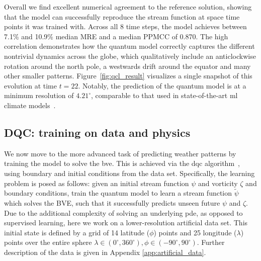 \documentclass[aps,pra,a4paper,twocolumn,longbibliography,groupedaddress]{revtex4-2}
\begin{document}
Overall we find excellent numerical agreement to the reference solution, showing that the model can successfully reproduce the stream function at space time points it was trained with. Across all 8 time steps, the model achieves between 7.1\% and 10.9\% median MRE and a median PPMCC of 0.870. The high correlation demonstrates how the quantum model correctly captures the different nontrivial dynamics across the globe, which qualitatively include an anticlockwise rotation around the north pole, a westwards drift around the equator and many other smaller patterns. Figure~\ref{fig:qcl_result} visualizes a single snapshot of this evolution at time $t=22$. Notably, the prediction of the quantum model is at a minimum resolution of $4.21^\circ$, comparable to that used in state-of-the-art \gls{ml} climate models~\cite{nguyen2023climax}.


\subsection{DQC: training on data and physics}
\label{subsec:dqc_results}

We now move to the more advanced task of predicting weather patterns by training the model to solve the \gls{bve}. This is achieved via the \gls{dqc} algorithm~\cite{kyriienko2021solving}, using boundary and initial conditions from the data set.
Specifically, the learning problem is posed as follows: given an initial stream function $\psi$ and   vorticity $\zeta$ and boundary conditions, train the quantum model to learn a stream function $\tilde{\psi}$ which solves the BVE, such that it successfully predicts unseen future $\psi$ and $\zeta$. Due to the additional complexity of solving an underlying \gls{pde}, as opposed to supervised learning, here we work on a lower-resolution artificial data set. 
This initial state is defined by a grid of 14 latitude ($\phi$) points and 25 longitude ($\lambda$) points over the entire sphere $\lambda \in (0^\circ, 360^\circ), \phi \in (-90^\circ, 90^\circ)$. Further description of the data is given in Appendix \ref{app:artificial_data}. 
\end{document}
